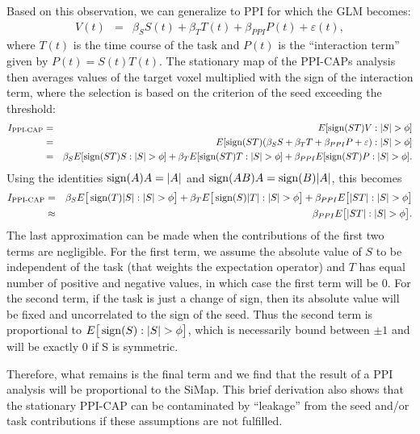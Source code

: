 Based on this observation, we can generalize to PPI for which the GLM becomes:
\begin{eqnarray}
\label{eqn:ppi_glm}
  V(t) & =& \beta_S S(t) + \beta_T T(t) + \beta_{PPI} P(t) + \varepsilon(t),
\end{eqnarray}
where $T(t)$ is the time course of the task and $P(t)$ is the ``interaction term'' given by $P(t) = S(t)T(t)$. The stationary map of the PPI-CAPs analysis then averages values of the target voxel multiplied with the sign of the interaction term, where the selection is based on the criterion of the seed exceeding the threshold: 
\begin{eqnarray*}
   I_\text{PPI-CAP} & = & E[ \sign(ST) V : \left| S\right|>\phi] \\
   & = & E[ \sign(ST) ( \beta_S S + \beta_T T + \beta_{PPI} P + \varepsilon) : \left| S\right| >\phi] \\
   & = & \beta_S E[ \sign(ST) S : \left| S \right|>\phi] + \beta_T E[\sign(ST) T : \left| S \right|>\phi] + \beta_{PPI} E[\sign(ST) P : \left| S \right| > \phi].
\end{eqnarray*}
Using the identities $\operatorname*{sign}(A)A = |A|$ and $\operatorname*{sign}(AB)A = \operatorname*{sign}(B) |A|$, this becomes
\begin{eqnarray*}
  I_\text{PPI-CAP} &= & \beta_S E\big[\sign(T)|S| : \left| S\right|>\phi\big] + \beta_T E\big[\sign(S)|T| : \left| S\right|>\phi\big] \label{eqn:ppi-T-term} + \beta_{PPI} E\big[|ST| : \left| S\right|>\phi\big] \\
  & \approx & \beta_{PPI} E\big[|ST| : \left| S\right|>\phi\big].
\end{eqnarray*}
The last approximation can be made when the contributions of the first two terms are negligible. 
For the first term, we assume the absolute value of $S$ to be independent of the task (that weights the expectation operator) and $T$ has equal number of positive and negative values, in which case the first term will be 0. 
For the second term, if the task is just a change of sign, then its absolute value will be fixed and uncorrelated to the sign of the seed. Thus the second term is proportional to $E\big[\sign(S) : \left| S\right|>\phi\big]$, which is necessarily bound between $\pm1$ and will be exactly 0 if S is symmetric.

Therefore, what remains is the final term and we find that the result of a PPI analysis will be proportional to the SiMap.
This brief derivation also shows that the stationary PPI-CAP can be contaminated by ``leakage'' from the seed and/or task contributions if these assumptions are not fulfilled. 


